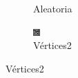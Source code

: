 \documentclass[11pt]{beamer}
\begin{document}
\begin{frame}
\begin{figure}[H]
\begin{subfigure}[h]{0.30\textwidth}
        \caption{Aleatoria}
        \label{fig:comp4px}
    \end{subfigure}%
    \hfill
    \begin{subfigure}[h]{0.3\textwidth} 
        \includegraphics[width=\textwidth]{img/tomovertices.png}
        \caption{Vértices2}
        \label{fig:vertices2}
    \end{subfigure}


\end{figure}
\end{frame}
\end{document}
